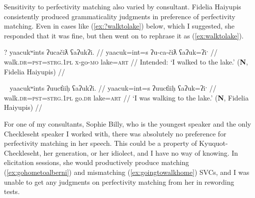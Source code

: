 \begin{comment}
(\ref{ex:drivehome}) and (\ref{ex:*drivehome}) show the same pattern and were elicited in the same way	. In (\ref{ex:drivehome}), the first verb \textit{ƛiḥaa} is in the continuative aspect, which is imperfective, and the second verb \textit{waałšiƛ} is in graduative, which is also imperfective. In (\ref{ex:*drivehome}), the same two verb roots are used, but instead of imperfective, graduative \textit{waałšiƛ}, there is momentaneous, perfective \textit{wałšiƛ}. This aspectual mismatch causes (\ref{ex:*drivehome}) to be ungrammatical.

\ex \label{ex:drivehome}
\begingl
\glpreamble ƛiḥaamitniš siy̓a łuučm̓uupukqs waałšiƛ. //
\gla ƛiḥ-(y)aˑ=(m)it=niˑš siy̓a łuučm̓uup=uk=qs wał-šiƛ-LS //
\glb drive-\textsc{cv}=\textsc{pst}=\textsc{strg.1pl} \textsc{1sg} sister=\textsc{poss}=\textsc{defn.1sg} go.home-\textsc{mo}-\textsc{gr} //
\glft `We were driving home in the car.' (\textbf{C}, \textit{tupaat} Julia Lucas) //
\endgl
\xe

\ex~ \label{ex:*drivehome}
\begingl
\glpreamble *wałšiƛw̓it̓asniš ƛiḥaa. //
\gla wał-šiƛ-w̓it̓as=niˑš ƛiḥ-(y)aˑ //
\glb go.home-\textsc{mo}-going.to=\textsc{strg.1pl} drive-\textsc{cv} //
\glft Intended: `We will drive home.' (\textbf{C}, \textit{tupaat} Julia Lucas) //
\endgl
\xe
\end{comment}

Sensitivity to perfectivity matching also varied by consultant. Fidelia Haiyupis consistently produced grammaticality judgments in preference of perfectivity matching. Even in cases like (\ref{ex:?walktolake}) below, which I suggested, she responded that it was fine, but then went on to rephrase it as (\ref{ex:walktolake}).

\ex \label{ex:?walktolake}
\begingl
\glpreamble ? yaacukʷints ʔucačiƛ ʕaʔukʔi. //
\gla yaacuk=int=s ʔu-ca-čiƛ ʕaʔuk=ʔiˑ //
\glb walk.\textsc{dr}=\textsc{pst}=\textsc{strg.1pl} \textsc{x}-go-\textsc{mo} lake=\textsc{art} //
\glft Intended: `I walked to the lake.' (\textbf{N}, Fidelia Haiyupis) //
\endgl
\xe

\ex~ \label{ex:walktolake}
\begingl
\glpreamble yaacukʷints ʔuuct̓iiḥ ʕaʔukʔi. //
\gla yaacuk=int=s ʔuuct̓iiḥ ʕaʔuk=ʔiˑ //
\glb walk.\textsc{dr}=\textsc{pst}=\textsc{strg.1pl} go.\textsc{dr} lake=\textsc{art} //
\glft `I was walking to the lake.' (\textbf{N}, Fidelia Haiyupis) //
\endgl
\xe

For one of my consultants, Sophie Billy, who is the youngest speaker and the only Checkleseht speaker I worked with, there was absolutely no preference for perfectivity matching in her speech. This could be a property of Kyuquot-Checkleseht, her generation, or her idiolect, and I have no way of knowing. In elicitation sessions, she would productively produce matching (\ref{ex:gohometoalberni}) and mismatching (\ref{ex:goingtowalkhome}) SVCs, and I was unable to get any judgments on perfectivity matching from her in rewording tests.

